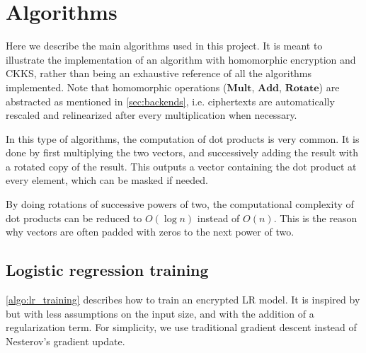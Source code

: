 \documentclass[a4paper,11pt,oneside]{report}
\begin{document}
\cleardoublepage
{}
{}
\printbibliography

\appendix
\chapter{Algorithms}

Here we describe the main algorithms used in this project. 
It is meant to illustrate the implementation of an algorithm with homomorphic encryption and CKKS, rather than being an exhaustive reference of all the algorithms implemented. 
Note that homomorphic operations ($\mathbf{Mult}$, $\mathbf{Add}$, $\mathbf{Rotate}$) are abstracted as mentioned in \autoref{sec:backends}, i.e. ciphertexts are automatically rescaled and relinearized after every multiplication when necessary.

In this type of algorithms, the computation of dot products is very common. 
It is done by first multiplying the two vectors, and successively adding the result with a rotated copy of the result. 
This outputs a vector containing the dot product at every element, which can be masked if needed.

By doing rotations of successive powers of two, the computational complexity of dot products can be reduced to $O(\log n)$ instead of $O(n)$. 
This is the reason why vectors are often padded with zeros to the next power of two.

\section{Logistic regression training}

\autoref{algo:lr_training} describes how to train an encrypted LR model.
It is inspired by \cite{kim_logistic_2018} but with less assumptions on the input size, and with the addition of a regularization term. 
For simplicity, we use traditional gradient descent instead of Nesterov's gradient update.
\end{document}
